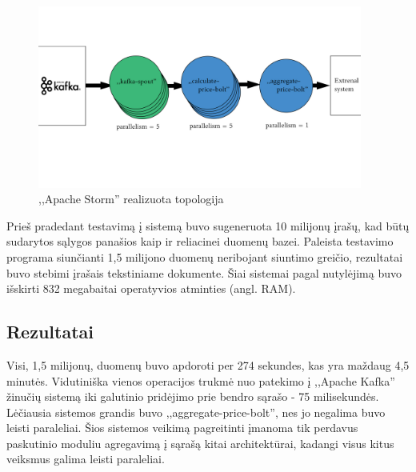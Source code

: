 \documentclass{VUMIFPSkursinis}
\begin{document}
\begin{figure}[!htbp]
    \centering
    \includegraphics[width=0.95\textwidth]{img/topology.jpg}
    \caption{,,Apache Storm'' realizuota topologija}
    \label{fig:stormtopology}
\end{figure}
Prieš pradedant testavimą į sistemą buvo sugeneruota 10 milijonų įrašų, kad būtų sudarytos sąlygos panašios kaip ir reliacinei duomenų bazei.
Paleista testavimo programa siunčianti 1,5 milijono duomenų neribojant siuntimo greičio, rezultatai buvo stebimi įrašais tekstiniame dokumente.
Šiai sistemai pagal nutylėjimą buvo išskirti 832 megabaitai operatyvios atminties (angl. RAM). 
\subsection{Rezultatai}
Visi, 1,5 milijonų, duomenų buvo apdoroti per 274 sekundes, kas yra maždaug 4,5 minutės. Vidutiniška vienos operacijos trukmė nuo 
patekimo į ,,Apache Kafka'' žinučių sistemą iki galutinio pridėjimo prie bendro sąrašo - 75 milisekundės.
Lėčiausia sistemos grandis buvo ,,aggregate-price-bolt'', nes jo negalima buvo leisti paraleliai. Šios sistemos veikimą pagreitinti 
įmanoma tik perdavus paskutinio moduliu agregavimą į sąrašą kitai architektūrai, kadangi visus kitus veiksmus galima leisti paraleliai.



\end{document}
